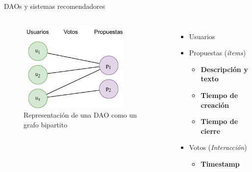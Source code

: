 \begin{frame}{DAOs y sistemas recomendadores}
    \begin{columns}
        \begin{figure}
            \centering
            \includegraphics[height=4.5cm]{images/diagrams/dao-as-a-graph.drawio.pdf}
            \caption{Representación de una DAO como un grafo bipartito}
        \end{figure}
        \begin{itemize}
            \item Usuarios
            \item Propuestas (\textit{ítems})
            \begin{itemize}
                \item \textbf{Descripción y texto}
                \item \textbf{Tiempo de creación}
                \item \textbf{Tiempo de cierre}
            \end{itemize}
            \item Votos (\textit{Interacción})
            \begin{itemize}
                \item \textbf{Timestamp}
            \end{itemize}
        \end{itemize}
    \end{columns}

\end{frame}

